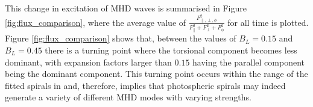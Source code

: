 This change in excitation of MHD waves is summarised in Figure \ref{fig:flux_comparison}, where the average value of $\displaystyle\frac{F_{\parallel, \perp, \phi}^2}{F_\parallel^2 + F_\perp^2 + F_\phi^2}$ for all time is plotted.
Figure \ref{fig:flux_comparison} shows that, between the values of $B_L=0.15$ and $B_L=0.45$ there is a turning point where the torsional component becomes less dominant, with expansion factors larger than $0.15$ having the parallel component being the dominant component.
This turning point occurs within the range of the fitted spirals in \cite{bonet2008} and, therefore, implies that photospheric spirals may indeed generate a variety of different MHD modes with varying strengths.